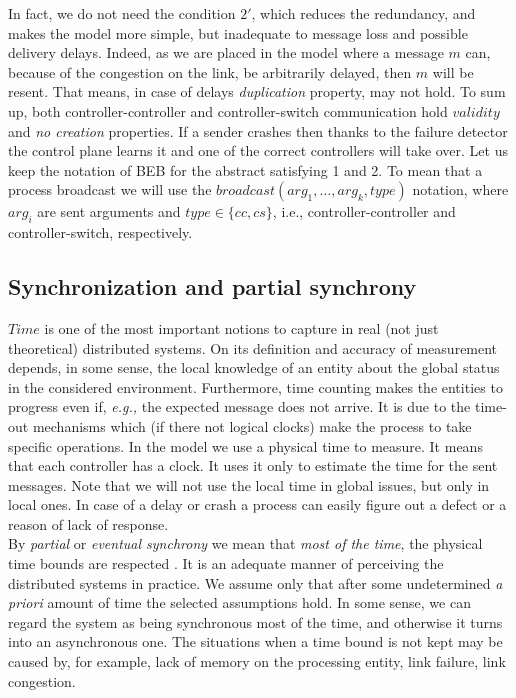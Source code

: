 \documentclass{article}
\theoremstyle{remark}
\begin{document}
In fact, we do not need the condition $2'$, which reduces the redundancy, and makes the model more simple, but  inadequate to message loss and possible delivery delays. Indeed, as we are placed in the model where a message $m$ can, because of the congestion on the link, be arbitrarily delayed, then $m$ will be resent. That means, in case of delays \emph{duplication} property, may not hold.
To sum up, both controller-controller and controller-switch communication hold $validity$ and \emph{no creation} properties.
If a sender crashes then thanks to the failure detector the control plane learns it and one of the correct controllers will take over.
Let us keep the notation of BEB for the abstract satisfying 1 and 2. To mean that a process broadcast we will use the $broadcast(arg_1,\ldots,arg_k,type)$ notation, where $arg_i$ are sent arguments and $type\in\lbrace cc,cs\rbrace$, i.e., controller-controller and controller-switch, respectively.
\subsection{Synchronization and partial synchrony}
$Time$ is one of the most important notions to capture in real (not just theoretical) distributed systems. On its definition and accuracy of measurement depends, in some sense, the local knowledge of an entity about the global status in the considered environment. Furthermore, time counting makes the entities to progress even if, \emph{e.g., }the expected message does not arrive. It is due to the time-out mechanisms which (if there not logical clocks) make the process to take specific operations.
In the model we use a physical time to measure. It means that each controller has a clock. It uses it only to estimate the time for the sent messages. Note that we will not use the local time in global issues, but only in local ones. In case of a delay or crash a process can easily figure out a defect or a reason of lack of response.\\
By \emph{partial} or \emph{eventual synchrony} we mean that \emph{most of the time}, the physical time bounds are respected \cite{Guerraoui:2010:IRD:1951643}. It is an adequate manner of perceiving the distributed systems in practice. We assume only that after some undetermined \emph{a priori} amount of time the selected assumptions hold. In some sense, we can regard the system as being synchronous most of the time, and otherwise it turns into an  asynchronous one.
The situations when a time bound is not kept may be caused by, for example, lack of memory on the processing entity, link failure, link congestion.
\end{document}
